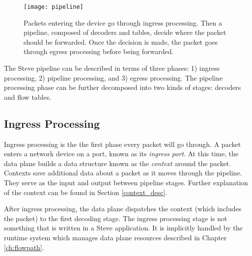 

\begin{figure} [ht] 
\texttt{[image: pipeline]}
\caption{Packets entering the device go through ingress processing.
Then a pipeline, composed of decoders and tables, decide where the packet
should be forwarded. Once the decision is made, the packet goes through
egress processing before being forwarded.} 
\label{fg:pipeline_model} 
\end{figure}

The Steve pipeline can be described in terms of three phases: 
1) ingress processing, 2) pipeline processing, and 3) egress processing. 
The pipeline processing phase can be further decomposed into two kinds
of stages: decoders and flow tables.



\subsection{Ingress Processing} \label{ingress_desc}

Ingress processing is the the first phase every packet will go through.
A packet enters a network device on a port, known as its \emph{ingress port}.
At this time, the data plane builds a data structure known as the
\emph{context} around the packet. 
Contexts save additional data about a packet as it moves through the pipeline.
They serve as the input and output between pipeline stages.
Further explanation of the context can be found in Section \ref{context_desc}.

After ingress processing, the data plane dispatches the context (which includes
the packet) to the first decoding stage. The ingress processing stage is not
something that is written in a Steve application. It is implicitly handled by
the runtime system which manages data plane resources described in Chapter
\ref{ch:flowpath}.

